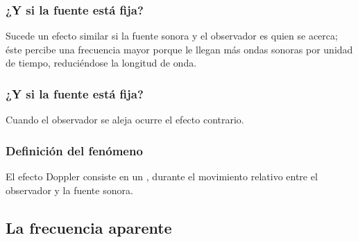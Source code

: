 \documentclass[14pt]{beamer}
\begin{document}
\begin{frame}
\frametitle{¿Y si la fuente está fija?}
Sucede un efecto similar si la fuente sonora  y el observador es quien se acerca; \pause éste percibe una frecuencia mayor porque le llegan más ondas sonoras por unidad de tiempo, reduciéndose la longitud de onda.
\end{frame}
\begin{frame}
\frametitle{¿Y si la fuente está fija?}
Cuando el observador se aleja ocurre el efecto contrario.
\end{frame}
\begin{frame}
\frametitle{Definición del fenómeno}
El efecto Doppler consiste en un , durante el movimiento relativo entre el observador y la fuente sonora.
\end{frame}

\subsection{La frecuencia aparente}
\end{document}
